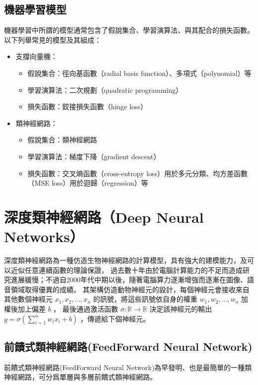 \subsection{機器學習模型}
機器學習中所謂的模型通常包含了假說集合、學習演算法、與其配合的損失函數。以下列舉常見的模型及其組成：
\begin{itemize}
    \item 支撐向量機：
    \begin{itemize}
        \item 假說集合：徑向基函數（radial basis function）、多項式（polynomial）等
        \item 學習演算法：二次規劃（quadratic programming）
        \item 損失函數：鉸接損失函數（hinge loss）
    \end{itemize}
    \item 類神經網路：
    \begin{itemize}
        \item 假說集合：類神經網路
        \item 學習演算法：梯度下降（gradient descent）
        \item 損失函數：交叉熵函數（cross-entropy loss）用於多元分類、均方差函數（MSE loss）用於迴歸（regression）等
    \end{itemize}
\end{itemize}

\section{深度類神經網路（Deep Neural Networks）}
深度類神經網路為一種仿造生物神經網路的計算模型，具有強大的建模能力，及可以近似任意連續函數的理論保證\cite{hornik1991approximation}，
過去數十年由於電腦計算能力的不足而造成研究進展緩慢；不過自2000年代中期以後，隨著電腦算力逐漸增強而逐漸在圖像、語音領域取得優異的成績。
其架構仿造動物神經元的設計，每個神經元會接收來自其他數個神經元 $x_1, x_2, \ldots, x_n$ 的訊號，將這些訊號依自身的權重 $w_1, w_2, \ldots, w_n$ 加權後加上偏差 $b$ ，
最後通過激活函數 $\sigma: \mathbb{R} \rightarrow \mathbb{R}$ 決定該神經元的輸出 $y = \sigma \left( \sum\limits_{i=1}^{n} w_i x_i + b \right)$ ，傳遞給下個神經元。

\subsection{前饋式類神經網路(FeedForward Neural Network)}
前饋式類神經網路(FeedForward Neural Network)為早發明、也是最簡單的一種類神經網路，可分爲單層與多層前饋式類神經網路。

